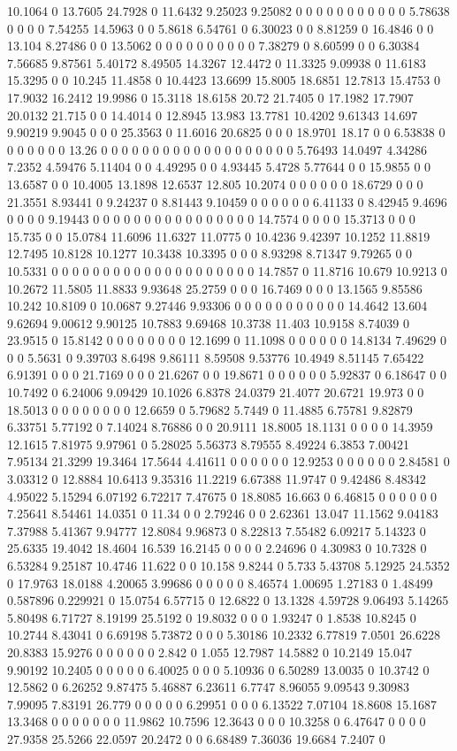 10.1064 0 13.7605 24.7928 0 11.6432 9.25023 9.25082 0 0 0 0 0 0 0 0 0 0 0 5.78638 0 0 0 0 7.54255 14.5963 0 0 5.8618 6.54761 0 6.30023 0 0 8.81259 0 16.4846 0 0 13.104 8.27486 0 0 13.5062 0 0 0 0 0 0 0 0 0 0 7.38279 0 8.60599 0 0 6.30384 7.56685 9.87561 5.40172 8.49505 14.3267 12.4472 0 11.3325 9.09938 0 11.6183 15.3295 0 0 10.245 11.4858 0 10.4423 13.6699 15.8005 18.6851 12.7813 15.4753 0 17.9032 16.2412 19.9986 0 15.3118 18.6158 20.72 21.7405 0 17.1982 17.7907 20.0132 21.715 0 0 14.4014 0 12.8945 13.983 13.7781 10.4202 9.61343 14.697 9.90219 9.9045 0 0 0 25.3563 0 11.6016 20.6825 0 0 0 18.9701 18.17 0 0 6.53838 0 0 0 0 0 0 0 13.26 0 0 0 0 0 0 0 0 0 0 0 0 0 0 0 0 0 0 0 5.76493 14.0497 4.34286 7.2352 4.59476 5.11404 0 0 4.49295 0 0 4.93445 5.4728 5.77644 0 0 15.9855 0 0 13.6587 0 0 10.4005 13.1898 12.6537 12.805 10.2074 0 0 0 0 0 0 18.6729 0 0 0 21.3551 8.93441 0 9.24237 0 8.81443 9.10459 0 0 0 0 0 0 6.41133 0 8.42945 9.4696 0 0 0 0 9.19443 0 0 0 0 0 0 0 0 0 0 0 0 0 0 0 0 14.7574 0 0 0 0 15.3713 0 0 0 15.735 0 0 15.0784 11.6096 11.6327 11.0775 0 10.4236 9.42397 10.1252 11.8819 12.7495 10.8128 10.1277 10.3438 10.3395 0 0 0 8.93298 8.71347 9.79265 0 0 10.5331 0 0 0 0 0 0 0 0 0 0 0 0 0 0 0 0 0 0 0 0 14.7857 0 11.8716 10.679 10.9213 0 10.2672 11.5805 11.8833 9.93648 25.2759 0 0 0 16.7469 0 0 0 13.1565 9.85586 10.242 10.8109 0 10.0687 9.27446 9.93306 0 0 0 0 0 0 0 0 0 0 0 14.4642 13.604 9.62694 9.00612 9.90125 10.7883 9.69468 10.3738 11.403 10.9158 8.74039 0 23.9515 0 15.8142 0 0 0 0 0 0 0 0 12.1699 0 11.1098 0 0 0 0 0 0 14.8134 7.49629 0 0 0 5.5631 0 9.39703 8.6498 9.86111 8.59508 9.53776 10.4949 8.51145 7.65422 6.91391 0 0 0 21.7169 0 0 0 21.6267 0 0 19.8671 0 0 0 0 0 0 5.92837 0 6.18647 0 0 10.7492 0 6.24006 9.09429 10.1026 6.8378 24.0379 21.4077 20.6721 19.973 0 0 18.5013 0 0 0 0 0 0 0 0 12.6659 0 5.79682 5.7449 0 11.4885 6.75781 9.82879 6.33751 5.77192 0 7.14024 8.76886 0 0 20.9111 18.8005 18.1131 0 0 0 0 14.3959 12.1615 7.81975 9.97961 0 5.28025 5.56373 8.79555 8.49224 6.3853 7.00421 7.95134 21.3299 19.3464 17.5644 4.41611 0 0 0 0 0 0 12.9253 0 0 0 0 0 0 2.84581 0 3.03312 0 12.8884 10.6413 9.35316 11.2219 6.67388 11.9747 0 9.42486 8.48342 4.95022 5.15294 6.07192 6.72217 7.47675 0 18.8085 16.663 0 6.46815 0 0 0 0 0 0 7.25641 8.54461 14.0351 0 11.34 0 0 2.79246 0 0 2.62361 13.047 11.1562 9.04183 7.37988 5.41367 9.94777 12.8084 9.96873 0 8.22813 7.55482 6.09217 5.14323 0 25.6335 19.4042 18.4604 16.539 16.2145 0 0 0 0 2.24696 0 4.30983 0 10.7328 0 6.53284 9.25187 10.4746 11.622 0 0 10.158 9.8244 0 5.733 5.43708 5.12925 24.5352 0 17.9763 18.0188 4.20065 3.99686 0 0 0 0 0 8.46574 1.00695 1.27183 0 1.48499 0.587896 0.229921 0 15.0754 6.57715 0 12.6822 0 13.1328 4.59728 9.06493 5.14265 5.80498 6.71727 8.19199 25.5192 0 19.8032 0 0 0 1.93247 0 1.8538 10.8245 0 10.2744 8.43041 0 6.69198 5.73872 0 0 0 5.30186 10.2332 6.77819 7.0501 26.6228 20.8383 15.9276 0 0 0 0 0 0 2.842 0 1.055 12.7987 14.5882 0 10.2149 15.047 9.90192 10.2405 0 0 0 0 0 6.40025 0 0 0 5.10936 0 6.50289 13.0035 0 10.3742 0 12.5862 0 6.26252 9.87475 5.46887 6.23611 6.7747 8.96055 9.09543 9.30983 7.99095 7.83191 26.779 0 0 0 0 0 6.29951 0 0 0 6.13522 7.07104 18.8608 15.1687 13.3468 0 0 0 0 0 0 0 11.9862 10.7596 12.3643 0 0 0 10.3258 0 6.47647 0 0 0 0 27.9358 25.5266 22.0597 20.2472 0 0 6.68489 7.36036 19.6684 7.2407 0 
